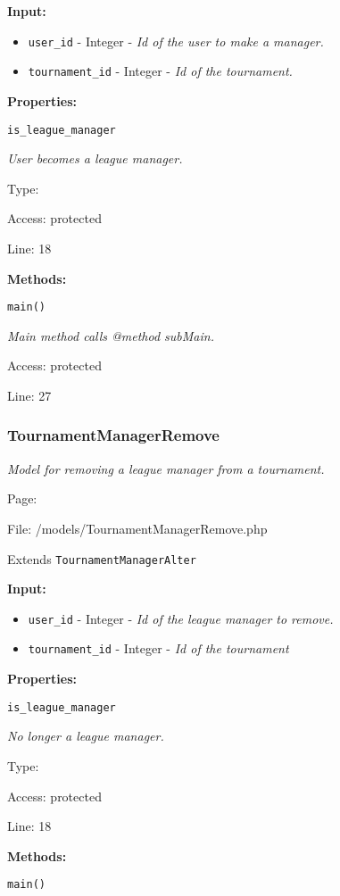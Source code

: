 \textbf{Input:}
\begin{itemize}
\item \texttt{user\_id} - Integer - \textit{Id of the user to make a manager.}
\item \texttt{tournament\_id} - Integer - \textit{Id of the tournament.}
\end{itemize}

\textbf{Properties:}

\texttt{is\_league\_manager}

{\scriptsize
\textit{User becomes a league manager.}

Type: 

Access: protected

Line: 18

}
\textbf{Methods:}

\texttt{main()}

{\scriptsize
\textit{Main method calls @method subMain.}

Access: protected

Line: 27

}

\subsubsection{TournamentManagerRemove}\label{TournamentManagerRemove.php.doc}
\textit{Model for removing a league manager from a tournament.}

Page: \pageref{TournamentManagerRemove.php}

File: /models/TournamentManagerRemove.php

Extends \texttt{TournamentManagerAlter}

\textbf{Input:}
\begin{itemize}
\item \texttt{user\_id} - Integer - \textit{Id of the league manager to remove.}
\item \texttt{tournament\_id} - Integer - \textit{Id of the tournament}
\end{itemize}

\textbf{Properties:}

\texttt{is\_league\_manager}

{\scriptsize
\textit{No longer a league manager.}

Type: 

Access: protected

Line: 18

}
\textbf{Methods:}

\texttt{main()}

